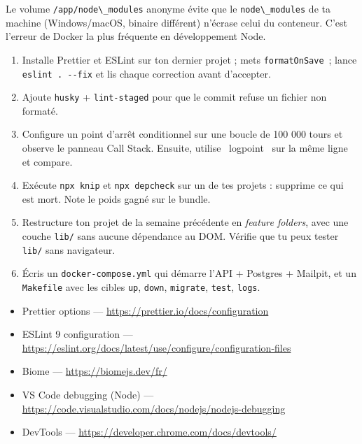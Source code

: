 \begin{note}
Le volume \verb|/app/node\_modules| anonyme \'evite que le \verb|node\_modules| de ta machine
(Windows/macOS, binaire diff\'erent) n'\'ecrase celui du conteneur. C'est l'erreur de Docker la
plus fr\'equente en d\'eveloppement Node.
\end{note}

\begin{exercice}
\begin{enumerate}
  \item Installe Prettier et ESLint sur ton dernier projet ; mets \verb|formatOnSave|~; lance
        \verb|eslint . --fix| et lis chaque correction avant d'accepter.
  \item Ajoute \verb|husky| + \verb|lint-staged| pour que le commit refuse un fichier non format\'e.
  \item Configure un point d'arr\^et conditionnel sur une boucle de 100 000 tours et observe le
        panneau Call Stack. Ensuite, utilise \og ~logpoint~ \fg{} sur la m\^eme ligne et compare.
  \item Ex\'ecute \verb|npx knip| et \verb|npx depcheck| sur un de tes projets : supprime ce qui
        est mort. Note le poids gagn\'e sur le bundle.
  \item Restructure ton projet de la semaine pr\'ec\'edente en \emph{feature folders}, avec une
        couche \verb|lib/| sans aucune d\'ependance au DOM. V\'erifie que tu peux tester \verb|lib/|
        sans navigateur.
  \item \'Ecris un \verb|docker-compose.yml| qui d\'emarre l'API + Postgres + Mailpit, et un
        \verb|Makefile| avec les cibles \verb|up|, \verb|down|, \verb|migrate|, \verb|test|, \verb|logs|.
\end{enumerate}
\end{exercice}

\begin{ressources}
\begin{itemize}
  \item Prettier options --- \url{https://prettier.io/docs/configuration}
  \item ESLint 9 configuration --- \url{https://eslint.org/docs/latest/use/configure/configuration-files}
  \item Biome --- \url{https://biomejs.dev/fr/}
  \item VS Code debugging (Node) --- \url{https://code.visualstudio.com/docs/nodejs/nodejs-debugging}
  \item DevTools --- \url{https://developer.chrome.com/docs/devtools/}
\end{itemize}
\end{ressources}

